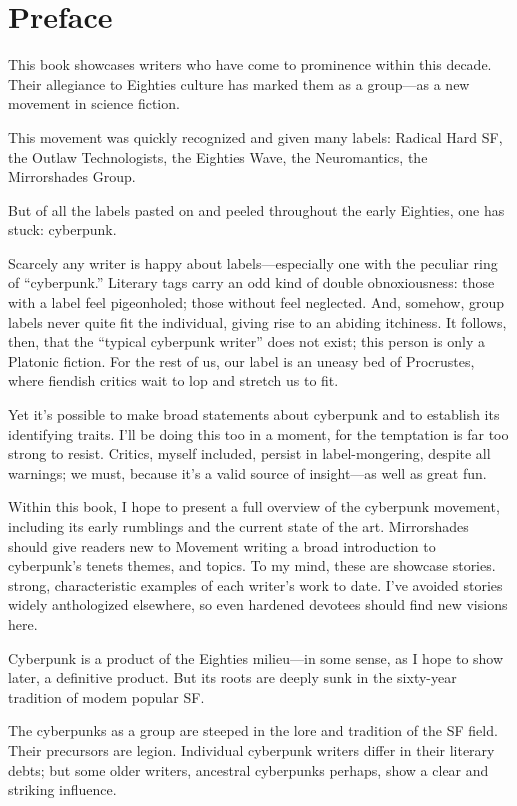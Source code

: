 \chapter{Preface}

This book showcases writers who have come to prominence within this decade. Their allegiance to Eighties culture has marked them as a group---as a new movement in science fiction.

This movement was quickly recognized and given many labels: Radical Hard SF, the Outlaw Technologists, the Eighties Wave, the Neuromantics, the Mirrorshades Group.

But of all the labels pasted on and peeled throughout the early Eighties, one has stuck: cyberpunk.

Scarcely any writer is happy about labels---especially one with the peculiar ring of ``cyberpunk.'' Literary tags carry an odd kind of double obnoxiousness: those with a label feel pigeonholed; those without feel neglected. And, somehow, group labels never quite fit the individual, giving rise to an abiding itchiness. It follows, then, that the ``typical cyberpunk writer'' does not exist; this person is only a Platonic fiction. For the rest of us, our label is an uneasy bed of Procrustes, where fiendish critics wait to lop and stretch us to fit.

Yet it's possible to make broad statements about cyberpunk and to establish its identifying traits. I'll be doing this too in a moment, for the temptation is far too strong to resist. Critics, myself included, persist in label-mongering, despite all warnings; we must, because it's a valid source of insight---as well as great fun.

Within this book, I hope to present a full overview of the cyberpunk movement, including its early rumblings and the current state of the art. Mirrorshades should give readers new to Movement writing a broad introduction to cyberpunk's tenets themes, and topics. To my mind, these are showcase stories. strong, characteristic examples of each writer's work to date. I've avoided stories widely anthologized elsewhere, so even hardened devotees should find new visions here.

Cyberpunk is a product of the Eighties milieu---in some sense, as I hope to show later, a definitive product. But its roots are deeply sunk in the sixty-year tradition of modem popular SF.

The cyberpunks as a group are steeped in the lore and tradition of the SF field. Their precursors are legion. Individual cyberpunk writers differ in their literary debts; but some older writers, ancestral cyberpunks perhaps, show a clear and striking influence.


